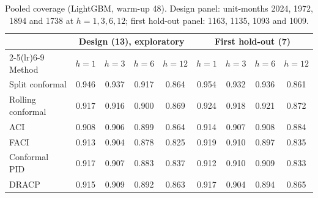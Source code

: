 \begin{table}[H]
\centering
\caption{Pooled coverage (LightGBM, warm-up 48). Design panel: unit-months 2024, 1972, 1894 and 1738 at $h=1,3,6,12$; first hold-out panel: 1163, 1135, 1093 and 1009.}
\label{tab:pooled}
\small
\begin{tabular}{@{}lcccccccc@{}}
\toprule
& \multicolumn{4}{c}{Design (13), exploratory} & \multicolumn{4}{c}{First hold-out (7)} \\
\cmidrule(lr){2-5}\cmidrule(lr){6-9}
Method & $h=1$ & $h=3$ & $h=6$ & $h=12$ & $h=1$ & $h=3$ & $h=6$ & $h=12$ \\
\midrule
Split conformal & 0.946 & 0.937 & 0.917 & 0.864 & 0.954 & 0.932 & 0.936 & 0.861 \\
Rolling conformal & 0.917 & 0.916 & 0.900 & 0.869 & 0.924 & 0.918 & 0.921 & 0.872 \\
ACI & 0.908 & 0.906 & 0.899 & 0.864 & 0.914 & 0.907 & 0.908 & 0.884 \\
FACI & 0.913 & 0.904 & 0.878 & 0.825 & 0.919 & 0.910 & 0.897 & 0.835 \\
Conformal PID & 0.917 & 0.907 & 0.883 & 0.837 & 0.912 & 0.910 & 0.909 & 0.833 \\
DRACP & 0.915 & 0.909 & 0.892 & 0.863 & 0.917 & 0.904 & 0.894 & 0.865 \\
\bottomrule
\end{tabular}
\end{table}
